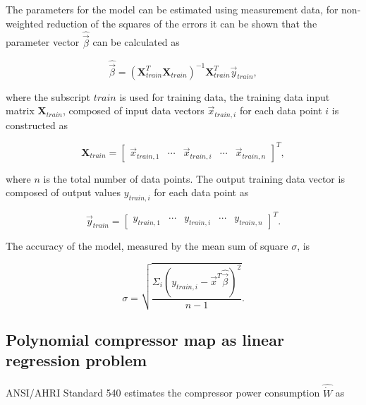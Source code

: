 The parameters for the model can be estimated using measurement data, for non-weighted reduction of the squares of the errors it can be shown that the  parameter vector $\hat {\vec \beta}$ can be calculated as

\begin{equation}
\hat {\vec \beta}  = {({\mathbf{X}}_{train}^T{{\mathbf{X}}_{train}})^{ - 1}}{\mathbf{X}}_{train}^T{\vec y_{train}},
\label{eq:estimte_parameters}
\end{equation}

where the subscript $train$ is used for training data, the training data input matrix ${{\mathbf{X}}_{train}}$, composed of input data vectors ${\vec x}_{train,i}$ for each data point $i$ is constructed as

\begin{equation}
 {{\mathbf{X}}_{train}} = {\left[ {\begin{array}{*{20}{c}} {{{\vec x}_{train,1}}}& \cdots &{{{\vec x}_{train,i}}}& \cdots &{{{\vec x}_{train,n}}}
\end{array}} \right]^T},
\label{eq:input_tr_matrix}
\end{equation}

where $n$ is the total number of data points. The output training data vector is composed of output values $y_{train,i}$ for each data point as

\begin{equation}
{\vec y_{train}} = {\left[ {\begin{array}{*{20}{c}}
  {{y_{train,1}}}& \cdots &{{y_{train,i}}}& \cdots &{{y_{train,n}}} 
\end{array}} \right]^T}.
\label{eq:output_tr_vector}
\end{equation}

The accuracy of the model, measured by the mean sum of square $\sigma$, is 

\begin{equation}
\sigma  = \sqrt {\frac {{\Sigma _i}{{({y_{train,i}} - {{\vec x}^T}\hat {\vec \beta} )}^2}} {n - 1}}.
\label{eq:acc_est_model}
\end{equation}

\subsection{Polynomial compressor map as linear regression problem}
\label{sec:linreg_compmap}
ANSI/AHRI Standard 540 \cite{AHRI:540} estimates the compressor power consumption $\hat {\dot W}$ as

